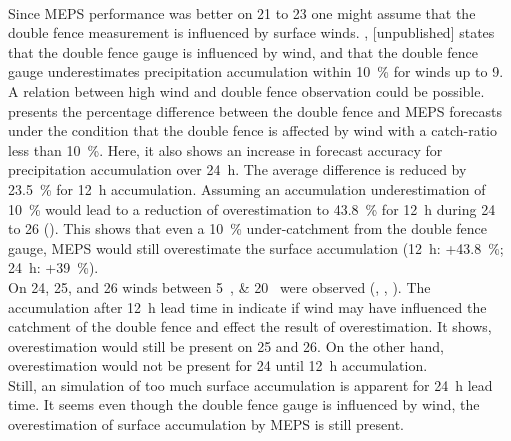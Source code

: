\noindent
\\
Since MEPS performance was better on \num{21} to \SI{23}{\dec} one might assume that the double fence measurement is influenced by surface winds. 
\citet{wolff_wmo_2018}, [unpublished] states that the double fence gauge is influenced by wind, and that the double fence gauge underestimates precipitation accumulation within \SI{10}{\percent} for winds up to \SI{9}{\mPs}. A relation between high wind and double fence observation could be possible.  presents the percentage difference between the double fence and MEPS forecasts under the condition that the double fence is affected by wind with a catch-ratio less than \SI{10}{\percent}. Here, it also shows an increase in forecast accuracy for precipitation accumulation over \SI{24}{\hour}.
The average difference is reduced by \SI{23.5}{\percent} for \SI{12}{\hour} accumulation. Assuming an accumulation underestimation of \SI{10}{\percent} would lead to a reduction of overestimation to \SI{43.8}{\percent} for \SI{12}{\hour} during \num{24} to \SI{26}{\dec} ().
This shows that even a \SI{10}{\percent} under-catchment from the double fence gauge, MEPS would still overestimate the surface accumulation (\SI{12}{\hour}: +\SI{43.8}{\percent}; \SI{24}{\hour}: +\SI{39}{\percent}).  
\\
On \num{24}, \num{25}, and \SI{26}{\dec} winds between \SIlist{5;20}{\mPs} were observed (, , ). The accumulation after \SI{12}{\hour} lead time in  indicate if wind may have influenced the catchment of the double fence and effect the result of overestimation. It shows, overestimation would still be present on \num{25} and \SI{26}{\dec}. On the other hand, overestimation would not be present for \SI{24}{\dec} until \SI{12}{\hour} accumulation.
\\
Still, an simulation of too much surface accumulation is apparent for \SI{24}{\hour} lead time.
It seems even though the double fence gauge is influenced by wind, the overestimation of surface accumulation by MEPS is still present. 
